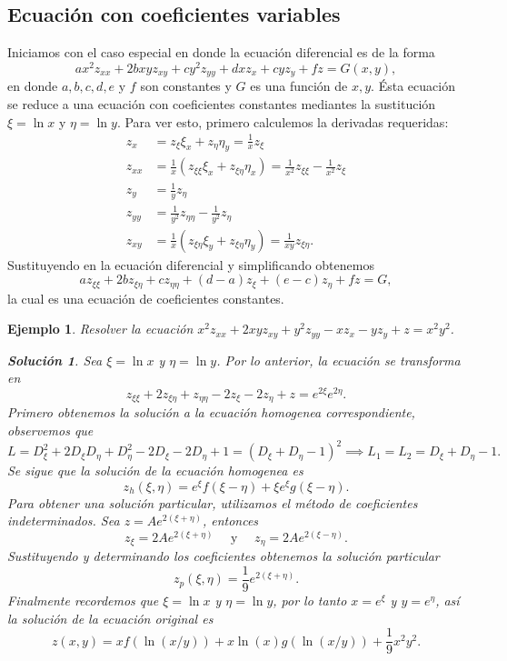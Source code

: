 \documentclass[11pt,letterpaper,draft]{report}
\newtheorem{example}[defn]{Ejemplo}
\newtheorem*{sol}{Solución}
\newcommand\<{\langle}
\renewcommand\>{\rangle}
\begin{document}
\subsection{Ecuación con coeficientes variables}

Iniciamos con el caso especial en donde la ecuación
diferencial es de la forma
\[
ax^2 z_{xx} + 2bxy z_{xy} + cy^2 z_{yy} + dx z_x + cy z_y +
fz = G(x,y),
\] 
en donde $a,b,c,d,e$ y $f$ son constantes y $G$ es una
función de $x,y$. Ésta ecuación se reduce a una ecuación con
coeficientes constantes mediantes la sustitución $\xi = \ln
x$ y $\eta = \ln y$. Para ver esto, primero calculemos la
derivadas requeridas:
\begin{align*}
  z_x &= z_\xi \xi_x + z_\eta \eta_y = \frac{1}{x} z_\xi\\
  z_{xx} &= \frac{1}{x}\left(z_{\xi\xi} \xi_x + z_{\xi\eta}
    \eta_x\right) = \frac{1}{x^2} z_{\xi\xi} -
    \frac{1}{x^2}z_\xi\\
    z_y &= \frac{1}{y}z_\eta\\
    z_{yy} &= \frac{1}{y^2}z_{\eta\eta} -
    \frac{1}{y^2}z_\eta\\
    z_{xy} &= \frac{1}{x}\left(z_{\xi\eta} \xi_y +
      z_{\xi\eta} \eta_y\right) = \frac{1}{xy}z_{\xi\eta}.
\end{align*}
Sustituyendo en la ecuación diferencial y simplificando
obtenemos
\[
a z_{\xi\xi} + 2bz_{\xi\eta} + cz_{\eta\eta} + (d-a)z_\xi +
(e-c)z_\eta + fz = G,
\] 
la cual es una ecuación de coeficientes constantes.

\begin{example}
  Resolver la ecuación $x^2z_{xx} + 2xyz_{xy} +
  y^2z_{yy}-xz_x-yz_y + z = x^2y^2$.
  \begin{sol}
    Sea $\xi = \ln x$ y $\eta = \ln y$. Por lo anterior, la
    ecuación se transforma en
    \[
    z_{\xi\xi} + 2z_{\xi\eta} + z_{\eta\eta} - 2z_{\xi} -
    2z_\eta + z = e^{2\xi}e^{2\eta}.
    \] 
    Primero obtenemos la solución a la ecuación homogenea
    correspondiente, observemos que
    \[
    L = D_\xi^2 + 2D_\xi D_\eta + D_\eta^2 - 2D_\xi - 2D_\eta
    + 1 = (D_\xi + D_\eta-1)^2 \implies L_1 = L_2 = D_\xi +
    D_\eta - 1.
    \] 
    Se sigue que la solución de la ecuación homogenea es
    \[
    z_h(\xi,\eta) = e^{\xi}f(\xi-\eta) + \xi
    e^{\xi}g(\xi-\eta).
    \] 
    Para obtener una solución particular, utilizamos el
    método de coeficientes indeterminados. Sea $z =
    Ae^{2(\xi+\eta)}$, entonces
    \[
    z_\xi = 2Ae^{2(\xi+\eta)} \quad \text{ y } \quad z_\eta
    = 2Ae^{2(\xi-\eta)}.
    \] 
    Sustituyendo y determinando los coeficientes obtenemos
    la solución particular
    \[
    z_p(\xi,\eta) = \frac{1}{9}e^{2(\xi+\eta)}.
    \] 
    Finalmente recordemos que $\xi = \ln x$ y $\eta = \ln
    y$, por lo tanto $x = e^{\xi}$ y $y = e^{\eta}$, así la
    solución de la ecuación original es
    \[
    z(x,y) = xf(\ln(x / y)) + x\ln(x)g(\ln(x / y)) +
    \frac{1}{9}x^2y^2.
    \] 
  \end{sol}
\end{example}
\end{document}
